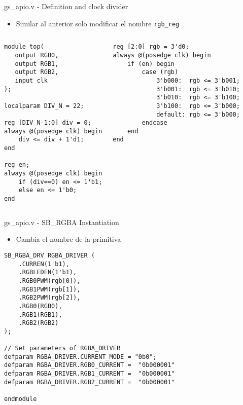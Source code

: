 \documentclass{beamer}
\begin{document}
\begin{frame}[fragile]{gs\_apio.v - Definition and clock divider}
\begin{itemize}
	\item Similar al anterior solo modificar el nombre \texttt{rgb\_reg}
\end{itemize}
\begin{columns}
\begin{center}\begin{adjustbox}{padding=2pt 0pt 0pt 0pt, cfbox=blue!50 1pt}\begin{lstlisting}
module top(
   output RGB0,
   output RGB1,
   output RGB2,
   input clk
);

localparam DIV_N = 22;

reg [DIV_N-1:0] div = 0;
always @(posedge clk) begin
	div <= div + 1'd1;
end

reg en;
always @(posedge clk) begin
	if (div==0) en <= 1'b1;
	else en <= 1'b0;
end
\end{lstlisting}\end{adjustbox}\end{center}
\begin{center}\begin{adjustbox}{padding=2pt 0pt 0pt 0pt, cfbox=blue!50 1pt}\begin{lstlisting}
reg [2:0] rgb = 3'd0;
always @(posedge clk) begin
	if (en) begin
		case (rgb)
			3'b000:  rgb <= 3'b001;
			3'b001:  rgb <= 3'b010;
			3'b010:  rgb <= 3'b100;
			3'b100:  rgb <= 3'b000;
			default: rgb <= 3'b000;
		endcase
	end
end
\end{lstlisting}\end{adjustbox}\end{center}
\end{columns}
\end{frame}

\begin{frame}[fragile]{gs\_apio.v - SB\_RGBA Instantiation}
\begin{itemize}
	\item Cambia el nombre de la primitiva
\end{itemize}
\begin{center}\begin{adjustbox}{padding=2pt 0pt 0pt 0pt, cfbox=blue!50 1pt}\begin{lstlisting}
SB_RGBA_DRV RGBA_DRIVER (
	.CURREN(1'b1),
	.RGBLEDEN(1'b1),
	.RGB0PWM(rgb[0]),
	.RGB1PWM(rgb[1]),
	.RGB2PWM(rgb[2]),
	.RGB0(RGB0),
	.RGB1(RGB1),
	.RGB2(RGB2)
);

// Set parameters of RGBA_DRIVER
defparam RGBA_DRIVER.CURRENT_MODE = "0b0";
defparam RGBA_DRIVER.RGB0_CURRENT =  "0b000001"
defparam RGBA_DRIVER.RGB1_CURRENT =  "0b000001"
defparam RGBA_DRIVER.RGB2_CURRENT =  "0b000001"

endmodule
\end{lstlisting}\end{adjustbox}\end{center}
\end{frame}
\end{document}

